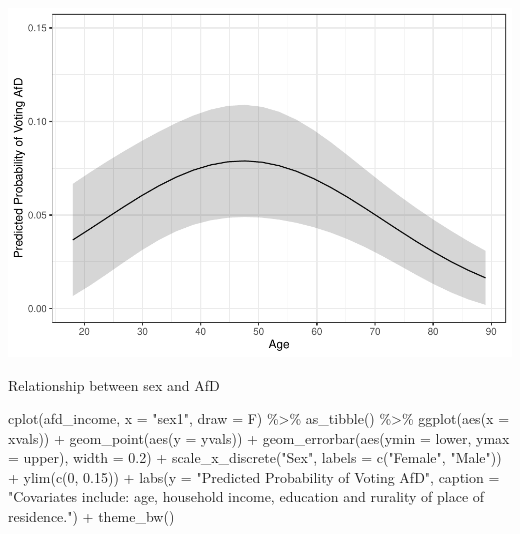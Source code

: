 \documentclass[
]{article}
\newenvironment{Shaded}{\begin{snugshade}}{\end{snugshade}}
\newcommand{\AttributeTok}[1]{\textcolor[rgb]{0.77,0.63,0.00}{#1}}
\newcommand{\DecValTok}[1]{\textcolor[rgb]{0.00,0.00,0.81}{#1}}
\newcommand{\FloatTok}[1]{\textcolor[rgb]{0.00,0.00,0.81}{#1}}
\newcommand{\FunctionTok}[1]{\textcolor[rgb]{0.00,0.00,0.00}{#1}}
\newcommand{\NormalTok}[1]{#1}
\newcommand{\SpecialCharTok}[1]{\textcolor[rgb]{0.00,0.00,0.00}{#1}}
\newcommand{\StringTok}[1]{\textcolor[rgb]{0.31,0.60,0.02}{#1}}
\begin{document}
\includegraphics{AVCD_Final_Assignment-Edenhofer_files/figure-latex/afd-age-1.pdf}

Relationship between sex and AfD

\begin{Shaded}
\begin{Highlighting}[]
\FunctionTok{cplot}\NormalTok{(afd\_income, }\AttributeTok{x =} \StringTok{"sex1"}\NormalTok{, }\AttributeTok{draw =}\NormalTok{ F) }\SpecialCharTok{\%\textgreater{}\%}
  \FunctionTok{as\_tibble}\NormalTok{() }\SpecialCharTok{\%\textgreater{}\%}
  \FunctionTok{ggplot}\NormalTok{(}\FunctionTok{aes}\NormalTok{(}\AttributeTok{x =}\NormalTok{ xvals)) }\SpecialCharTok{+}
  \FunctionTok{geom\_point}\NormalTok{(}\FunctionTok{aes}\NormalTok{(}\AttributeTok{y =}\NormalTok{ yvals)) }\SpecialCharTok{+}
  \FunctionTok{geom\_errorbar}\NormalTok{(}\FunctionTok{aes}\NormalTok{(}\AttributeTok{ymin =}\NormalTok{ lower, }\AttributeTok{ymax =}\NormalTok{ upper), }\AttributeTok{width =} \FloatTok{0.2}\NormalTok{) }\SpecialCharTok{+}
  \FunctionTok{scale\_x\_discrete}\NormalTok{(}\StringTok{"Sex"}\NormalTok{, }\AttributeTok{labels =} \FunctionTok{c}\NormalTok{(}\StringTok{"Female"}\NormalTok{, }\StringTok{"Male"}\NormalTok{)) }\SpecialCharTok{+}
  \FunctionTok{ylim}\NormalTok{(}\FunctionTok{c}\NormalTok{(}\DecValTok{0}\NormalTok{, }\FloatTok{0.15}\NormalTok{)) }\SpecialCharTok{+}
  \FunctionTok{labs}\NormalTok{(}\AttributeTok{y =} \StringTok{"Predicted Probability of Voting AfD"}\NormalTok{, }
       \AttributeTok{caption =} \StringTok{"Covariates include: age, household income, education and rurality of place of residence."}\NormalTok{) }\SpecialCharTok{+}
  \FunctionTok{theme\_bw}\NormalTok{()}
\end{Highlighting}
\end{Shaded}
\end{document}
